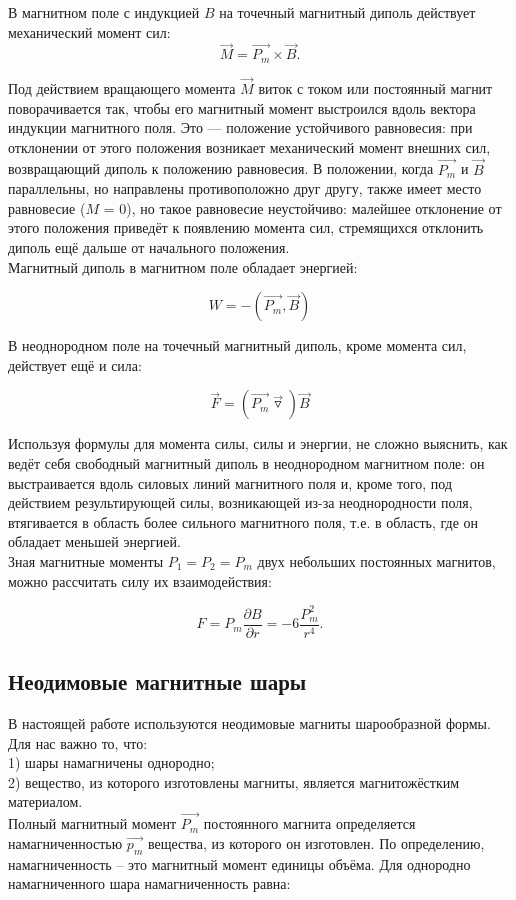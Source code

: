 \documentclass[a4paper,12pt]{article}
\begin{document}
В магнитном поле с индукцией $B$
на точечный магнитный диполь 
действует механический
момент сил:
\begin{equation}
\vec{M} = \overrightarrow{P_m}\times \vec{B}.
\end{equation}

Под действием вращающего момента $\vec{M}$ виток с током или постоянный магнит поворачивается
так, чтобы его магнитный момент выстроился вдоль вектора индукции магнитного поля. Это —
положение устойчивого равновесия: при отклонении от этого положения возникает механический
момент внешних сил, возвращающий диполь к положению равновесия. В положении, когда $\overrightarrow{P_m}$ и $\vec{B}$
параллельны, но направлены противоположно друг другу, также имеет место равновесие ($M$ = 0),
но такое равновесие неустойчиво: малейшее отклонение от этого положения приведёт к появлению
момента сил, стремящихся отклонить диполь ещё дальше от начального положения.\\
Магнитный диполь в магнитном поле обладает энергией:

\begin{equation}
W = -(\overrightarrow{P_m},\vec{B})
\end{equation}

В неоднородном поле на точечный магнитный диполь, кроме момента сил, действует ещё и сила:

\begin{equation}
\vec{F} = (\overrightarrow{P_m} \vec{\triangledown }) \vec{B}
\end{equation}

Используя формулы для момента силы, силы и энергии, не сложно выяснить, как ведёт себя
свободный магнитный диполь в неоднородном магнитном поле: он выстраивается вдоль силовых
линий магнитного поля и, кроме того, под действием результирующей силы, возникающей из-за
неоднородности поля, втягивается в область более сильного магнитного поля, т.е. в область, где он
обладает меньшей энергией.\\
Зная магнитные моменты $P_1 = P_2 = P_m$ двух небольших постоянных магнитов, можно рассчитать силу
их взаимодействия:

\begin{equation}
F = P_m \frac{\partial B}{\partial r}=-6\frac{P_m^2}{r^4}.
\end{equation}

\subsection*{Неодимовые магнитные шары}
В настоящей работе используются неодимовые магниты шарообразной формы.
Для нас важно то, что:\\
1) шары намагничены однородно;\\
2) вещество, из которого изготовлены магниты, является магнитожёстким материалом.\\
Полный магнитный момент $\overrightarrow{P_m}$
постоянного магнита определяется намагниченностью $\overrightarrow{p_m}$
вещества, из которого он изготовлен. По определению, намагниченность – это магнитный момент единицы объёма. Для однородно намагниченного шара намагниченность равна:
\end{document}
